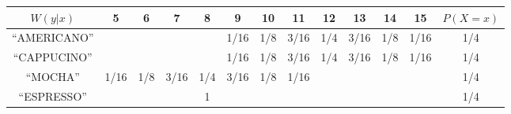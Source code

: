 \begin{tabular}{c|c|c|c|c|c|c|c|c|c|c|c||c|}
$W(y|x)$    & 5    & 6   & 7    & 8   & 9    & 10  & 11   & 12  & 13   & 14  & 15   & $P(X=x)$ \\ \hline
“AMERICANO” &      &     &      &     & 1/16 & 1/8 & 3/16 & 1/4 & 3/16 & 1/8 & 1/16 & 1/4      \\ \hline
“CAPPUCINO” &      &     &      &     & 1/16 & 1/8 & 3/16 & 1/4 & 3/16 & 1/8 & 1/16 & 1/4      \\ \hline
“MOCHA”     & 1/16 & 1/8 & 3/16 & 1/4 & 3/16 & 1/8 & 1/16 &     &      &     &      & 1/4      \\ \hline
“ESPRESSO”  &      &     &      & 1   &      &     &      &     &      &     &      & 1/4      \\ \hline
\end{tabular}
